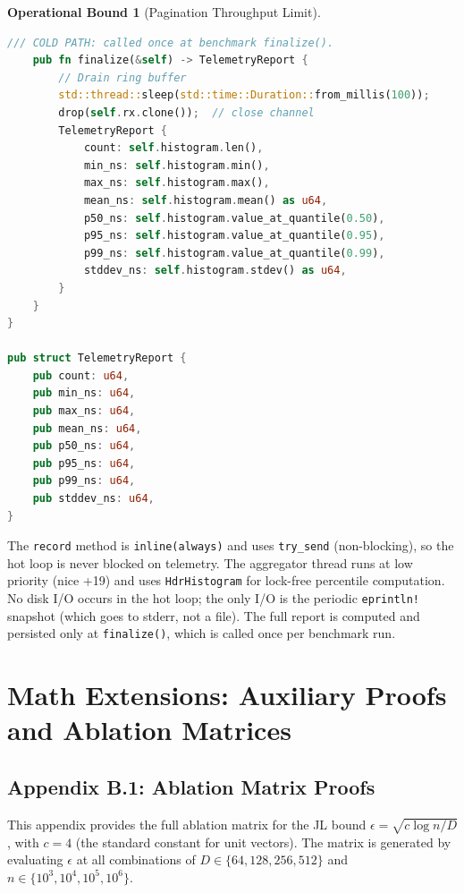 \documentclass[10pt,twocolumn]{article}
\theoremstyle{definition}
\newtheorem{operationalbound}[theorem]{Operational Bound}
\theoremstyle{remark}
\begin{document}
\begin{operationalbound}[Pagination Throughput Limit]
\begin{lstlisting}[language=Rust, caption={Lock-free SPSC telemetry
sink: \texttt{record} in hot loop (no I/O),
\texttt{finalize} flushes to disk once at end.},label={lst:telemetry-sink}]
    /// COLD PATH: called once at benchmark finalize().
    pub fn finalize(&self) -> TelemetryReport {
        // Drain ring buffer
        std::thread::sleep(std::time::Duration::from_millis(100));
        drop(self.rx.clone());  // close channel
        TelemetryReport {
            count: self.histogram.len(),
            min_ns: self.histogram.min(),
            max_ns: self.histogram.max(),
            mean_ns: self.histogram.mean() as u64,
            p50_ns: self.histogram.value_at_quantile(0.50),
            p95_ns: self.histogram.value_at_quantile(0.95),
            p99_ns: self.histogram.value_at_quantile(0.99),
            stddev_ns: self.histogram.stdev() as u64,
        }
    }
}

pub struct TelemetryReport {
    pub count: u64,
    pub min_ns: u64,
    pub max_ns: u64,
    pub mean_ns: u64,
    pub p50_ns: u64,
    pub p95_ns: u64,
    pub p99_ns: u64,
    pub stddev_ns: u64,
}
\end{lstlisting}

The \texttt{record} method is \texttt{inline(always)} and uses
\texttt{try\_send} (non-blocking), so the hot loop is never blocked
on telemetry. The aggregator thread runs at low priority (nice +19)
and uses \texttt{HdrHistogram} for lock-free percentile computation.
No disk I/O occurs in the hot loop; the only I/O is the periodic
\texttt{eprintln!} snapshot (which goes to stderr, not a file). The
full report is computed and persisted only at \texttt{finalize()},
which is called once per benchmark run.

\setcounter{section}{13}
\section{Math Extensions: Auxiliary Proofs and Ablation Matrices}
\label{app:math}


\subsection{Appendix B.1: Ablation Matrix Proofs}
\label{app:ablation}

This appendix provides the full ablation matrix for the JL bound
$\epsilon = \sqrt{c \log n / D}$ \citep{ghojogh2021jl}, with
$c = 4$ (the standard constant for unit vectors). The matrix is
generated by evaluating $\epsilon$ at all combinations of $D \in
\{64, 128, 256, 512\}$ and $n \in \{10^3, 10^4, 10^5, 10^6\}$.


\end{operationalbound}
\end{document}
